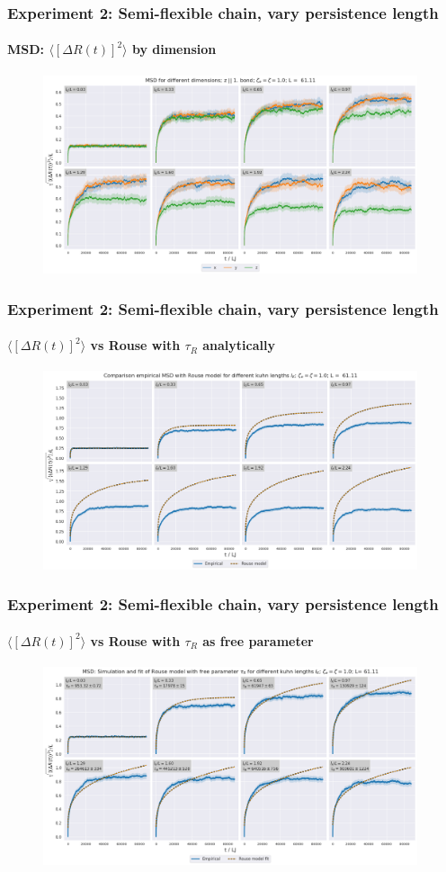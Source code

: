 \documentclass[handout]{beamer}
\newcommand{\mean}[1]{\langle #1 \rangle}
\begin{document}
\begin{frame}
    \frametitle{Experiment 2: Semi-flexible chain, vary persistence length}
    \framesubtitle{MSD: $\mean{[\Delta R(t)]^2}$ by dimension}

    \begin{figure}[h]
        \includegraphics[width=11cm]{./4-exp-msd_by_dim.png}
    \end{figure}
\end{frame}



\begin{frame}
    \frametitle{Experiment 2: Semi-flexible chain, vary persistence length}
    \framesubtitle{$\mean{[\Delta R(t)]^2}$ vs Rouse with $\tau_R$ analytically}

    \begin{figure}[h]
        \includegraphics[width=11cm]{./4-exp-delta_R-rouse_anal.png}
    \end{figure}
\end{frame}


\begin{frame}
    \frametitle{Experiment 2: Semi-flexible chain, vary persistence length}
    \framesubtitle{$\mean{[\Delta R(t)]^2}$ vs Rouse with $\tau_R$ as free parameter}

    \begin{figure}[h]
        \includegraphics[width=11cm]{./4-exp-delta_R-rouse_fit.png}
    \end{figure}
\end{frame}
\end{document}
